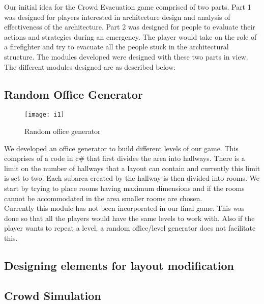 Our initial idea for the Crowd Evacuation game comprised of two parts. Part 1 was designed for players interested in architecture design and analysis of effectiveness of the architecture. Part 2 was designed for people to evaluate their actions and strategies during an emergency. The player would take on the role of a firefighter and try to evacuate all the people stuck in the architectural structure. The modules developed were designed with these two parts in view. The different modules designed are as described below:
\subsection{Random Office Generator}
\begin{figure}[H]
    \centering
    {{\texttt{[image: i1]}}}
    \caption{Random office generator}
\end{figure}
We developed an office generator to build different levels of our game. This comprises of a code in c$\#$ that first divides the area into hallways. There is a limit on the number of hallways that a layout can contain and currently this limit is set to two. Each subarea created by the hallway is then divided into rooms. We start by trying to place rooms having maximum dimensions and if the rooms cannot be accommodated in the area smaller rooms are chosen.\\
Currently this module has not been incorporated in our final game. This was done so that all the players would have the same levels to work with. Also if the player wants to repeat a level, a random office/level generator does not facilitate this.
\subsection{Designing elements for layout modification}

\subsection{Crowd Simulation}

